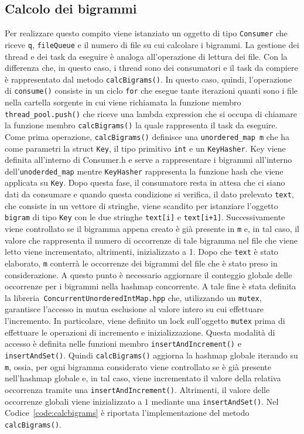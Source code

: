\documentclass[10pt,twocolumn,letterpaper]{article}
\begin{document}
\subsection{Calcolo dei bigrammi}
\label{sub:calcbigrams}
Per realizzare questo compito viene istanziato un oggetto di tipo \texttt{Consumer} che riceve \texttt{q}, \texttt{fileQueue} e il numero di file su cui calcolare i bigrammi. La gestione dei thread 
e dei task da eseguire è analoga all'operazione di lettura dei file. Con la differenza che, in questo caso, i thread sono dei consumatori e il task da compiere è 
rappresentato dal metodo \texttt{calcBigrams()}. In questo caso, quindi, l'operazione di \texttt{consume()} consiste in un ciclo \texttt{for} che esegue tante iterazioni quanti sono i file nella cartella
sorgente in cui viene richiamata la funzione membro \texttt{thread\_pool.push()} che riceve una lambda expression che si occupa di chiamare la funzione membro \texttt{calcBigrams()}
la quale rappresenta il task da eseguire. Come prima operazione, \texttt{calcBigrams()} definisce una \texttt{unordered\_map m} che ha come parametri la struct \texttt{Key}, il tipo primitivo \texttt{int}
e un \texttt{KeyHasher}. Key viene definita all'interno di Consumer.h e serve a rappresentare i bigrammi all'interno dell'\texttt{unoderded\_map} mentre \texttt{KeyHasher} rappresenta la funzione
hash che viene applicata su \texttt{Key}. Dopo questa fase, il consumatore resta in attesa che ci siano dati da consumare e quando questa condizione si verifica, il dato prelevato
\texttt{text}, che consiste in un vettore di stringhe, viene scandito per istanziare l'oggetto \texttt{bigram} di tipo \texttt{Key} con le due stringhe \texttt{text[i]} e \texttt{text[i+1]}.
Successivamente viene controllato se il bigramma appena creato è già presente in \texttt{m} e, in tal caso, il valore che rappresenta il numero
di occorrenze di tale bigramma nel file che viene letto viene incrementato, altrimenti, inizializzato a 1. Dopo che \texttt{text} è stato elaborato, \texttt{m} conterrà le occorrenze dei 
bigrammi del file che è stato preso in considerazione. A questo punto è necessario aggiornare il conteggio globale delle occorrenze per i bigrammi nella hashmap concorrente.
A tale fine è stata definita la libreria\texttt{ ConcurrentUnorderedIntMap.hpp} che, utilizzando un \texttt{mutex}, garantisce l'accesso in mutua esclusione al valore intero su cui effettuare
l'incremento. In particolare, viene definito un lock sull'oggetto \texttt{mutex} prima di effettuare le operazioni di incremento e inizializzazione. Questa modalità di accesso è 
definita nelle funzioni membro \texttt{insertAndIncrement()} e \texttt{insertAndSet()}. Quindi \texttt{calcBigrams()} aggiorna la hashmap globale iterando su \texttt{m}, ossia, per ogni bigramma considerato viene 
controllato se è già presente nell'hashmap globale e, in tal caso, viene incrementato il valore della relativa occorrenza tramite una \texttt{insertAndIncrement()}. Altrimenti, il valore
delle occorrenze globali viene inizializzato a $1$ mediante una \texttt{insertAndSet()}. Nel Codice~\ref{code:calcbigrams} è riportata l'implementazione del metodo \texttt{calcBigrams()}.

\end{document}
